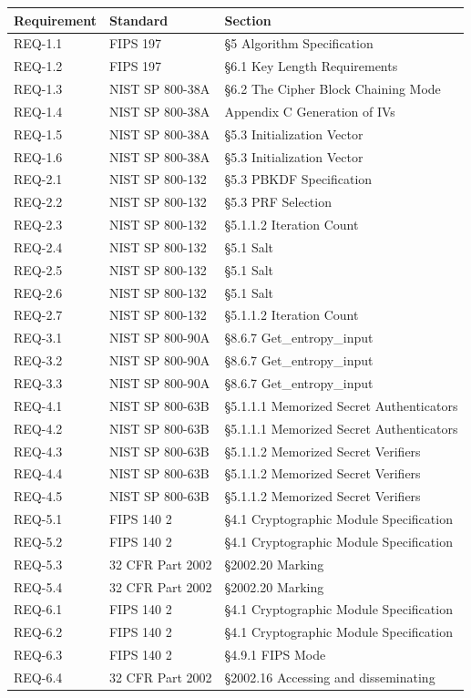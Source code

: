 \documentclass[11pt,letterpaper]{article}
\begin{document}
\begin{tabularx}{\textwidth}{llX}
\toprule
\textbf{Requirement} & \textbf{Standard} & \textbf{Section} \\
\midrule
REQ-1.1 & FIPS 197 & \S5 Algorithm Specification \\
REQ-1.2 & FIPS 197 & \S6.1 Key Length Requirements \\
REQ-1.3 & NIST SP 800-38A & \S6.2 The Cipher Block Chaining Mode \\
REQ-1.4 & NIST SP 800-38A & Appendix C Generation of IVs \\
REQ-1.5 & NIST SP 800-38A & \S5.3 Initialization Vector \\
REQ-1.6 & NIST SP 800-38A & \S5.3 Initialization Vector \\
REQ-2.1 & NIST SP 800-132 & \S5.3 PBKDF Specification \\
REQ-2.2 & NIST SP 800-132 & \S5.3 PRF Selection \\
REQ-2.3 & NIST SP 800-132 & \S5.1.1.2 Iteration Count \\
REQ-2.4 & NIST SP 800-132 & \S5.1 Salt \\
REQ-2.5 & NIST SP 800-132 & \S5.1 Salt \\
REQ-2.6 & NIST SP 800-132 & \S5.1 Salt \\
REQ-2.7 & NIST SP 800-132 & \S5.1.1.2 Iteration Count \\
REQ-3.1 & NIST SP 800-90A & \S8.6.7 Get\_entropy\_input \\
REQ-3.2 & NIST SP 800-90A & \S8.6.7 Get\_entropy\_input \\
REQ-3.3 & NIST SP 800-90A & \S8.6.7 Get\_entropy\_input \\
REQ-4.1 & NIST SP 800-63B & \S5.1.1.1 Memorized Secret Authenticators \\
REQ-4.2 & NIST SP 800-63B & \S5.1.1.1 Memorized Secret Authenticators \\
REQ-4.3 & NIST SP 800-63B & \S5.1.1.2 Memorized Secret Verifiers \\
REQ-4.4 & NIST SP 800-63B & \S5.1.1.2 Memorized Secret Verifiers \\
REQ-4.5 & NIST SP 800-63B & \S5.1.1.2 Memorized Secret Verifiers \\
REQ-5.1 & FIPS 140 2 & \S4.1 Cryptographic Module Specification \\
REQ-5.2 & FIPS 140 2 & \S4.1 Cryptographic Module Specification \\
REQ-5.3 & 32 CFR Part 2002 & \S2002.20 Marking \\
REQ-5.4 & 32 CFR Part 2002 & \S2002.20 Marking \\
REQ-6.1 & FIPS 140 2 & \S4.1 Cryptographic Module Specification \\
REQ-6.2 & FIPS 140 2 & \S4.1 Cryptographic Module Specification \\
REQ-6.3 & FIPS 140 2 & \S4.9.1 FIPS Mode \\
REQ-6.4 & 32 CFR Part 2002 & \S2002.16 Accessing and disseminating \\
\bottomrule
\end{tabularx}
\end{document}
